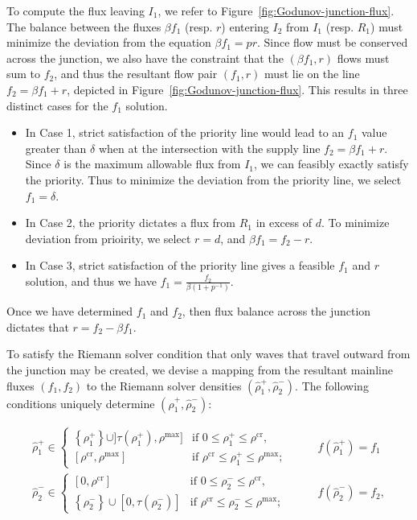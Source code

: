 To compute the flux leaving $I_1$, we refer to Figure~\ref{fig:Godunov-junction-flux}. The balance between the fluxes $\beta f_1$ (resp. $r$) entering $I_2$  from $I_1$ (resp. $R_1$) must minimize the deviation from the equation $\beta f_1 = p r$. Since flow must be conserved across the junction, we also have the constraint that the $\left(\beta f_1, r\right)$ flows must sum to $f_2$, and thus the resultant flow pair $\left(f_1, r\right)$ must lie on the line $f_2 = \beta f_1 + r$, depicted in Figure~\ref{fig:Godunov-junction-flux}. This results in three distinct cases for the $f_1$ solution.

\begin{itemize}
	\item In Case 1, strict satisfaction of the priority line would lead to an $f_1$ value greater than $\delta$ when at the intersection with the supply line $f_2 = \beta f_1 + r$. Since $\delta$ is the maximum allowable flux from $I_1$, we can feasibly exactly satisfy the priority. Thus to minimize the deviation from the priority line, we select $f_1 = \delta$.
	\item In Case 2, the priority dictates a flux from $R_1$ in excess of $d$. To minimize deviation from prioirity, we select $r = d$, and $\beta f_1 = f_2 - r$.
	\item In Case 3, strict satisfaction of the priority line gives a feasible $f_1$ and $r$ solution, and thus we have $f_1 = \frac{f_2}{\beta \left(1 + p^{-1}\right)}$.
\end{itemize}


Once we have determined $f_1$ and $f_2$, then flux balance across the junction dictates that $r = f_2 - \beta f_1$.

To satisfy the Riemann solver condition that only waves that travel outward from the junction may be created, we devise a mapping from the resultant mainline fluxes $\left(f_1, f_2\right)$ to the Riemann solver densities $\left(\hat{\rho}_1^+, \hat{\rho}_2^-\right)$. The following conditions uniquely determine $\left(\hat{\rho}_1^+, \hat{\rho}_2^-\right)$:

\begin{align}
\hat{\rho}_1^+ \in
\begin{cases}
\left\{\rho_1^+\right\}\cup ]\tau(\rho_1^+),\rho^{\max}] & \text{if } 0 \le \rho_1^+ \le \rho^\text{cr}, \\
\left[\rho^{\text{cr}}, \rho^{\max}\right] & \text{if }  \rho^\text{cr} \le  \rho_1^+ \le \rho^{\max};
\end{cases} &\quad  & f\left(\hat{\rho}_1^+\right) = f_1 \\
\hat{\rho}_2^- \in
\begin{cases}
\left[0,\rho^{\text{cr}}\right] & \text{if } 0 \le \rho_2^- \le \rho^\text{cr}, \\
 \left\{\rho_2^-\right\}\cup [0,\tau(\rho_2^-)]
 & \text{if }  \rho^\text{cr} \le  \rho_2^- \le \rho^{\max};
\end{cases} &\quad  & f\left(\hat{\rho}_2^-\right) = f_2,
\end{align}


